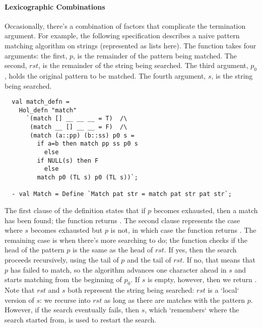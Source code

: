 \paragraph{Lexicographic Combinations}

Occasionally, there's a combination of factors that complicate the
termination argument. For example, the following specification
describes a naive pattern matching algorithm on strings (represented
as lists here). The function takes four arguments: the first, $p$,
is the remainder of the pattern being matched. The second,
$\mathit{rst}$, is the remainder of the string being searched.  The third
argument, $p_0$, holds the original pattern to be matched.
The fourth argument, $s$, is the string being searched.
%
\setcounter{sessioncount}{0}
\begin{session}
\begin{verbatim}
  val match_defn =
    Hol_defn "match"
      `(match [] __ __ __ = T)  /\
       (match __ [] __ __ = F)  /\
       (match (a::pp) (b::ss) p0 s =
         if a=b then match pp ss p0 s
           else
         if NULL(s) then F
           else
         match p0 (TL s) p0 (TL s))`;

  - val Match = Define `Match pat str = match pat str pat str`;
\end{verbatim}
\end{session}
%
The first clause of the definition states that if $p$ becomes exhausted, then a match has
been found;  the function returns . The second clause represents the case
where $s$ becomes exhausted but $p$ is not, in which case the function returns
\holtxt{F}. The remaining case is when there's more searching to do; the function
checks if the head of the pattern $p$ is the same as the head of
$\mathit{rst}$. If yes, then the search proceeds recursively, using the
tail of $p$ and the tail of $\mathit{rst}$. If no, that means that $p$ has
failed to match, so the algorithm advances one character ahead in
$\mathit{s}$ and starts matching from the beginning of $p_0$. If
$\mathit{s}$ is empty, however, then we return \holtxt{F}. Note that
$\mathit{rst}$ and $s$ both represent the string being
searched: $\mathit{rst}$ is a `local` version of $s$: we recurse into
$\mathit{rst}$  as long as there are matches with the pattern $p$. However,
if the search eventually fails, then $s$, which `remembers` where the search
started from, is used to restart the search.

